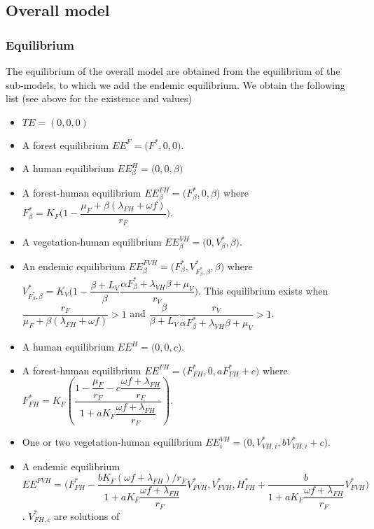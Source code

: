 \documentclass{article}
\newcommand{\lf}{\lambda_{FH}}
\newcommand{\lv}{\lambda_{VH}}
\newcommand{\Fbeta}{F^*_\beta}
\newcommand{\VbetaF}{V^*_{\Fbeta, \beta}}
\newcommand{\FHterme}{\omega f + \lf}
\begin{document}
\subsection{Overall model}
\subsubsection{Equilibrium}
The equilibrium of the overall model are obtained from the equilibrium of the sub-models, to which we add the endemic equilibrium. We obtain the following list (see above for the existence and values)

\begin{itemize}
\item $TE = (0,0,0)$
\item A forest equilibrium $EE^F = \Big(F^*, 0, 0 \Big) $.
\item A human equilibrium $EE^H_\beta = \Big(0,0,\beta \Big)$
\item A forest-human equilibrium $EE^{FH}_\beta = \Big(F^*_\beta, 0, \beta\Big)$ where $F^*_\beta = K_F \Big(1-\dfrac{\mu_F + \beta(\lf + \omega f)}{r_F} \Big)$.
\item A vegetation-human equilibrium $EE^{VH}_\beta = \Big(0, V^*_{\beta}, \beta \Big)$.
\item An endemic equilibrium $EE_\beta^{FVH} = \Big(F^*_\beta, V^*_{F^*_\beta, \beta}, \beta \Big)$ where $\VbetaF = K_V \Big(1- \dfrac{\beta +L_V}{\beta} \dfrac{\alpha \Fbeta + \lv \beta + \mu_V}{r_V} \Big)$. This equilibrium exists  when $\dfrac{r_F}{\mu_F + \beta(\lf + \omega f)} > 1$ and $\dfrac{\beta}{\beta + L_V} \dfrac{r_V}{\alpha \Fbeta + \lv \beta + \mu_V} > 1$.


\item A human equilibrium $EE^H = \Big(0,0,c\Big)$.
\item A forest-human equilibrium $EE^{FH} = \Big(F^*_{FH}, 0, a F^*_{FH} + c \Big)$ where $F^*_{FH} = K_F \left( \dfrac{1 - \dfrac{\mu_F}{r_F} - c \dfrac{\omega f + \lf}{r_F}}{1 + a K_F \dfrac{\omega f + \lf}{r_F}} \right)$.
\item One or two vegetation-human equilibrium $EE^{VH}_i = \Big(0, V^*_{VH, i}, bV^*_{VH, i}+c \Big)$.
\item A endemic equilibrium $EE^{FVH} = \Big(F^*_{FH} - \dfrac{b K_F (\FHterme) / r_F}{1 + aK_F \dfrac{\FHterme}{r_F}} V^*_{FVH}, V^*_{FVH}, H^*_{FH}+ \dfrac{b}{1 + aK_F \dfrac{\FHterme}{r_F}}V^*_{FVH} \Big)$. $V^*_{FH, c}$ are solutions of 
\end{itemize}
\end{document}
